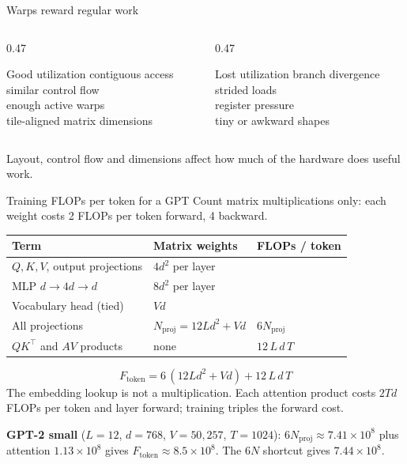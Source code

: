 \documentclass[handout]{beamer}
\begin{document}
\begin{frame}{Warps reward regular work}
  \begin{columns}[t]
    \begin{column}{0.47\linewidth}
      \begin{block}{Good utilization}
        contiguous access\\similar control flow\\enough active warps\\tile-aligned matrix dimensions
      \end{block}
    \end{column}
    \begin{column}{0.47\linewidth}
      \begin{alertblock}{Lost utilization}
        branch divergence\\strided loads\\register pressure\\tiny or awkward shapes
      \end{alertblock}
    \end{column}
  \end{columns}
  \vfill
  \centering Layout, control flow and dimensions affect how much of the hardware does useful work.
\end{frame}



\begin{frame}{Training FLOPs per token for a GPT}
  \small
  Count matrix multiplications only: each weight costs 2 FLOPs per token forward, 4 backward.
  \begin{center}
    \begin{tabular}{@{}lll@{}}
      \toprule
      Term & Matrix weights & FLOPs / token \\
      \midrule
      $Q,K,V$, output projections & $4d^2$ per layer & \\
      MLP $d\to4d\to d$ & $8d^2$ per layer & \\
      Vocabulary head (tied) & $Vd$ & \\
      \midrule
      All projections & $N_{\text{proj}}=12Ld^2+Vd$ & $6N_{\text{proj}}$ \\
      $QK^\top$ and $AV$ products & none & $12\,L\,d\,T$ \\
      \bottomrule
    \end{tabular}
  \end{center}
  \vspace{-8pt}
  \[
    F_{\text{token}} = 6\,(12Ld^2+Vd)+12\,L\,d\,T
  \]
  \footnotesize The embedding lookup is not a multiplication. Each attention product costs $2Td$ FLOPs per token and layer forward; training triples the forward cost.\par
  \vspace{3pt}
  \textbf{GPT-2 small} ($L=12$, $d=768$, $V=50{,}257$, $T=1024$): $6N_{\text{proj}}\approx7.41\times10^{8}$ plus attention $1.13\times10^{8}$ gives $F_{\text{token}}\approx8.5\times10^{8}$. The $6N$ shortcut gives $7.44\times10^{8}$.
\end{frame}
\end{document}
